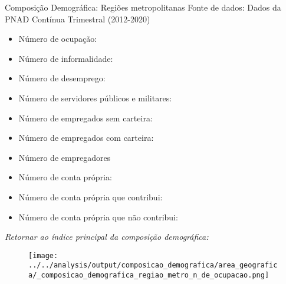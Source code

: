 \begin{frame}[label=_composicao_demografica_regiao_metro]{Composição Demográfica: Regiões metropolitanas}
{\footnotesize Fonte de dados: Dados da PNAD Contínua Trimestral (2012-2020)}
\begin{itemize}
\item{Número de ocupação: \hyperlink{_composicao_demografica_regiao_metro_n_de_ocupacao}{}}
\item{Número de informalidade: \hyperlink{_composicao_demografica_regiao_metro_n_de_informalidade}{}}
\item{Número de desemprego: \hyperlink{_composicao_demografica_regiao_metro_n_de_desemprego}{}}
\item{Número de servidores públicos e militares: \hyperlink{_composicao_demografica_regiao_metro_n_militar}{}}
\item{Número de empregados sem carteira: \hyperlink{_composicao_demografica_regiao_metro_n_empregadoSC}{}}
\item{Número de empregados com carteira: \hyperlink{_composicao_demografica_regiao_metro_n_empregadoCC}{}}
\item{Número de empregadores \hyperlink{_composicao_demografica_regiao_metro_n_empregador}{}}
\item{Número de conta própria: \hyperlink{_composicao_demografica_regiao_metro_n_cpropria}{}}
\item{Número de conta própria que contribui: \hyperlink{_composicao_demografica_regiao_metro_n_cpropriaC}{}}
\item{Número de conta própria que não contribui: \hyperlink{_composicao_demografica_regiao_metro_n_cpropriaNc}{}}
\end{itemize}

\begin{small}
\textit{Retornar ao índice principal da composição demográfica: \hyperlink{_composicao_demografica}{} }
\end{small}

\end{frame}

\begin{frame}[label=_composicao_demografica_regiao_metro_n_de_ocupacao]{}
\textit{\hyperlink{_composicao_demografica_regiao_metro}{}}
\begin{figure}
  \centering
  \texttt{[image: ../../analysis/output/composicao\_demografica/area\_geografica/\_composicao\_demografica\_regiao\_metro\_n\_de\_ocupacao.png]}
  \caption{}
  \label{fig:_composicao_demografica_regiao_metro_n_de_ocupacao}
\end{figure}
\end{frame}


